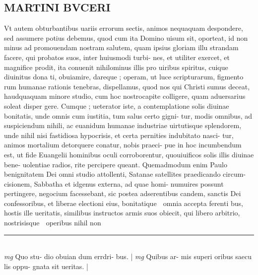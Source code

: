 \documentclass{article}
\begin{document}
\begin{pages}
\section*{MARTINI BVCERI }\pstart Vt autem obturbantibus   uariis errorum sectis, animos nequaquam despondere, sed assumere potius debemus, quod cum ita Domino uisum sit, oporteat, id non minus ad promouendam nostram salutem, quam ipsius gloriam illu strandam facere, qui probatos suos, inter huiusmodi turbi- nes, et utiliter exercet, et magnifice prodit, ita conuenit nihilominus illis pro uiribus spiritus, cuique  diuinitus dona ti, obuiamire, dareque ; operam, ut luce scripturarum, figmento rum humanae rationis tenebras, dispellamus, quod nos qui Christi sumus deceat, haudquaquam minore studio, cum hoc nostrocapite colligere, quam aduersarius soleat disper gere. Cumque ; ueterator iste, a contemplatione solis diuinae bonitatis, unde omnis cum iustitia, tum salus certo gigni- tur, modis omnibus, ad suspiciendum nihili, ac euanidum humanae industriae uirtutisque  splendorem, unde nihil nisi fastidiosa hypocrisis, et certa pernities indubitato nasci- tur, animos mortalium detorquere conatur, nobis praeci- pue in hoc incumbendum est, ut fide Euangelii hominibus oculi corroborentur, quouiuificos solis illis diuinae bene- uolentiae radios, rite percipere queant.   \pend\pstart Quemadmodum enim Paulo benignitatem Dei omni studio attollenti, Satanae satellites praedicando circum- cisionem, Sabbatha et idgenus externa, ad quae homi- numuires possunt pertingere, negocium facessebant, sic postea adserentibus candem, sanctis Dei confessoribus, et liberae electioni eius, bonitatique  omnia accepta ferenti bus, hostis ille ueritatis, similibus instructos armis suos obiecit, qui libero arbitrio, nostrisisque  operibus nihil non  \pend
\vspace{0.5cm}\noindent
\vspace{0.2cm}\rule{1cm}{0.2pt}\\ 
\hspace{0.2cm}\textit{mg}
\footnotesize Quo stu- dio obuian dum errdri- bus.  
\normalsize| 
\hspace{0.2cm}\textit{mg}
\footnotesize Quibus  ar- mis superi oribus   saecu lis oppu- gnata sit ueritas.  
\normalsize| 

\end{pages}
\end{document}
